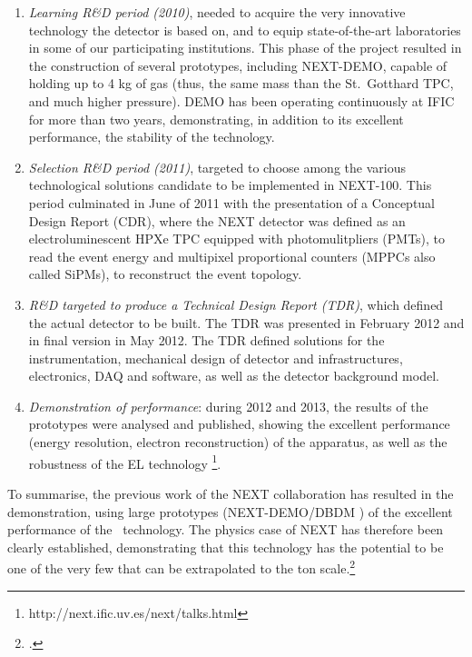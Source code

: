 \begin{enumerate}
\item {\em Learning R\&D period (2010)}, needed to acquire the very innovative technology the detector is based on, and to equip state-of-the-art laboratories in some of our participating institutions. This phase of the project resulted in the construction of several prototypes, including NEXT-DEMO, capable of holding up to 4 kg of gas (thus, the same mass than  the St.~Gotthard TPC, and much higher pressure). DEMO has been operating continuously at IFIC for more than two years, demonstrating, in addition to its excellent performance, the stability of the technology.  

\item {\em Selection R\&D period (2011)}, targeted to choose among the various technological solutions candidate to be implemented in NEXT-100. This period culminated in June of 2011 with the presentation of a Conceptual Design Report (CDR), where the NEXT detector was defined as an electroluminescent HPXe TPC equipped with photomulitpliers (PMTs),  to read the event energy and multipixel proportional counters (MPPCs also called SiPMs), to reconstruct the event topology. 

\item {\em R\&D targeted to produce a Technical Design Report (TDR)}, which defined the actual detector to be built. The TDR was presented in February 2012 and in final version in May 2012. The TDR defined solutions for the instrumentation, mechanical design of detector and infrastructures, electronics, DAQ and software, as well as the detector background model. 

\item {\em Demonstration of performance}: during 2012 and 2013, the results of the prototypes were analysed and published, showing the excellent performance (energy resolution, electron reconstruction) of the apparatus, as well as the robustness of the EL technology \footnote{http://next.ific.uv.es/next/talks.html}.  
\end{enumerate}

To summarise, the previous work of the NEXT collaboration has resulted in the demonstration, using large prototypes (NEXT-DEMO/DBDM ) of the excellent performance of the \HPXE\ technology.  The physics case of NEXT has therefore been clearly established, demonstrating that this technology has the potential to be one of the very few that can be extrapolated to the ton scale.\footcite{GomezCadenas:2012jv} 

